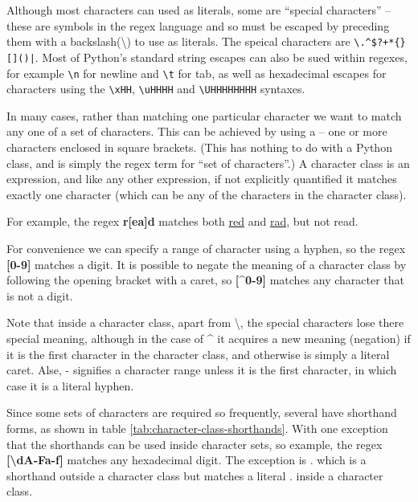 Although most characters can used as literals, some are ``special characters'' -- these are symbols in the regex language and so must be escaped by preceding them with a backslash(\textbackslash{}) to use as literals.
The speical characters are \verb-\.^$?+*{}[]()|-.
Most of Python's standard string escapes can also be sued within regexes, for example \verb|\n| for newline and \verb|\t| for tab, as well as hexadecimal escapes for characters using the \verb|\xHH|, \verb|\uHHHH| and \verb|\UHHHHHHHH| syntaxes.



In many cases, rather than matching one particular character we want to match any one of a set of characters.
This can be achieved by using a  -- one or more characters enclosed in square brackets.
(This has nothing to do with a Python class, and is simply the regex term for ``set of characters''.)
A character class is an expression, and like any other expression, if not explicitly quantified it matches exactly one character (which can be any of the characters in the character class).

For example, the regex \textbf{r[ea]d} matches both \underline{red} and \underline{rad}, but not read.


For convenience we can specify a range of character using a hyphen, so the regex \textbf{[0-9]} matches a digit.
It is possible to negate the meaning of a character class by following the opening bracket with a caret, so \textbf{[\^{}0-9]} matches any character that is not a digit.



\begin{tcolorbox}
  Note that inside a character class, apart from \textbackslash, the special characters lose there special meaning, although in the case of \^{} it acquires a new meaning (negation) if it is the first character in the character class, and otherwise is simply a literal caret.
  Alse, \--{} signifies a character range unless it is the first character, in which case it is a literal hyphen.
\end{tcolorbox}


Since some sets of characters are required so frequently, several have shorthand forms, as shown in table \ref{tab:character-class-shorthands}.
With one exception that the shorthands can be used inside character sets, so example, the regex \textbf{[\textbackslash dA-Fa-f]} matches any hexadecimal digit.
The exception is . which is a shorthand outside a character class but matches a literal . inside a character class.

